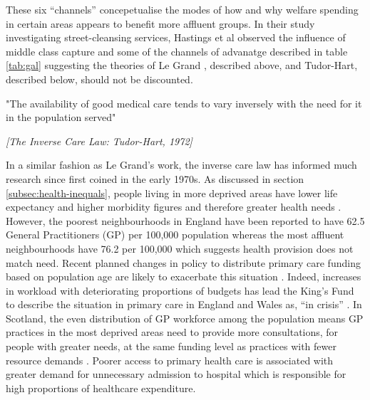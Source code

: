 \documentclass[12pt,]{report}
\begin{document}
\begin{table}[h]
{
}
\end{table}

These six ``channels'' concepetualise the modes of how and why welfare
spending in certain areas appears to benefit more affluent groups. In
their study investigating street-cleansing services, Hastings et al
\citeyearpar{RN116} observed the influence of middle class capture and
some of the channels of advanatge described in table \ref{tab:gal}
suggesting the theories of Le Grand \citeyearpar{RN175}, described
above, and Tudor-Hart, described below, should not be discounted.

\epigraph{"The availability of good medical care tends to vary inversely with the need for it in the population served"}{\textit{[The Inverse Care Law: Tudor-Hart, 1972]}}

In a similar fashion as Le Grand's work, the inverse care law has
informed much research since first coined in the early 1970s. As
discussed in section \ref{subsec:health-inequals}, people living in more
deprived areas have lower life expectancy and higher morbidity figures
and therefore greater health needs \citep{RN37}. However, the poorest
neighbourhoods in England have been reported to have 62.5 General
Practitioners (GP) per 100,000 population whereas the most affluent
neighbourhoods have 76.2 per 100,000 \citep{RN317} which suggests health
provision does not match need. Recent planned changes in policy to
distribute primary care funding based on population age are likely to
exacerbate this situation \citep{RN39}. Indeed, increases in workload
with deteriorating proportions of budgets has lead the King's Fund to
describe the situation in primary care in England and Wales as, ``in
crisis'' \citep[pp.3]{RN318}. In Scotland, the even distribution of GP
workforce among the population means GP practices in the most deprived
areas need to provide more consultations, for people with greater needs,
at the same funding level as practices with fewer resource demands
\citep{RN148, RN27}. Poorer access to primary health care is associated
with greater demand for unnecessary admission to hospital
\citep{RN49, RN268} which is responsible for high proportions of
healthcare expenditure.
\end{document}
